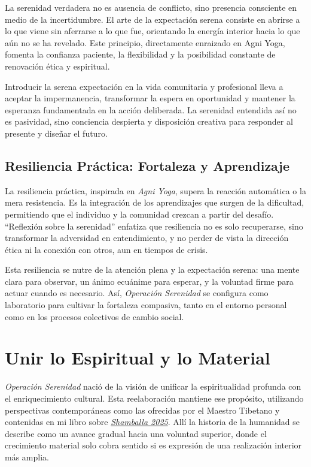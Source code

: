 \documentclass[
]{book}
\begin{document}
La serenidad verdadera no es ausencia de conflicto, sino presencia consciente en medio de la incertidumbre. El arte de la expectación serena consiste en abrirse a lo que viene sin aferrarse a lo que fue, orientando la energía interior hacia lo que aún no se ha revelado. Este principio, directamente enraizado en Agni Yoga, fomenta la confianza paciente, la flexibilidad y la posibilidad constante de renovación ética y espiritual.

Introducir la serena expectación en la vida comunitaria y profesional lleva a aceptar la impermanencia, transformar la espera en oportunidad y mantener la esperanza fundamentada en la acción deliberada. La serenidad entendida así no es pasividad, sino conciencia despierta y disposición creativa para responder al presente y diseñar el futuro.

\subsection{Resiliencia Práctica: Fortaleza y Aprendizaje}\label{resiliencia-pruxe1ctica-fortaleza-y-aprendizaje}

La resiliencia práctica, inspirada en \emph{Agni Yoga}, supera la reacción automática o la mera resistencia. Es la integración de los aprendizajes que surgen de la dificultad, permitiendo que el individuo y la comunidad crezcan a partir del desafío. ``Reflexión sobre la serenidad'' enfatiza que resiliencia no es solo recuperarse, sino transformar la adversidad en entendimiento, y no perder de vista la dirección ética ni la conexión con otros, aun en tiempos de crisis.

Esta resiliencia se nutre de la atención plena y la expectación serena: una mente clara para observar, un ánimo ecuánime para esperar, y la voluntad firme para actuar cuando es necesario. Así, \emph{Operación Serenidad} se configura como laboratorio para cultivar la fortaleza compasiva, tanto en el entorno personal como en los procesos colectivos de cambio social.

\section{Unir lo Espiritual y lo Material}\label{unir-lo-espiritual-y-lo-material}

\emph{Operación Serenidad} nació de la visión de unificar la espiritualidad profunda con el enriquecimiento cultural. Esta reelaboración mantiene ese propósito, utilizando perspectivas contemporáneas como las ofrecidas por el Maestro Tibetano y contenidas en mi libro sobre \href{https://transhimalayica.mx/producto/the-centennial-conclave/}{\emph{Shamballa 2025}}. Allí la historia de la humanidad se describe como un avance gradual hacia una voluntad superior, donde el crecimiento material solo cobra sentido si es expresión de una realización interior más amplia.
\end{document}
